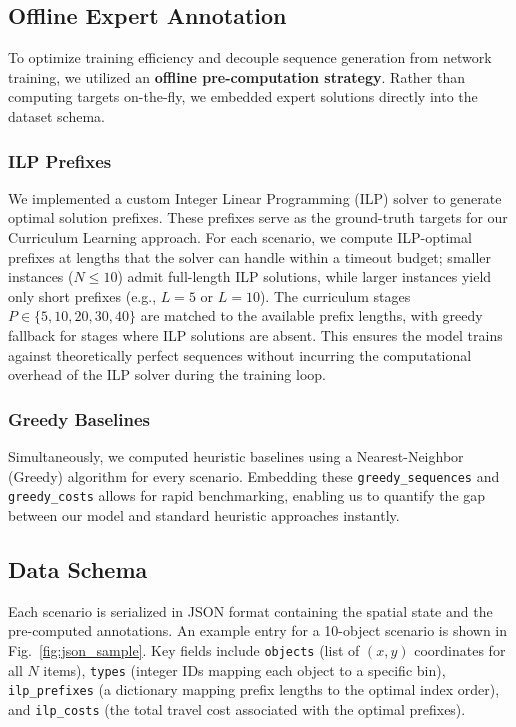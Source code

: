 \documentclass[conference]{IEEEtran}
\begin{document}
\subsection{Offline Expert Annotation}
To optimize training efficiency and decouple sequence generation from network training, we utilized an \textbf{offline pre-computation strategy}. Rather than computing targets on-the-fly, we embedded expert solutions directly into the dataset schema.

\subsubsection{ILP Prefixes}
We implemented a custom Integer Linear Programming (ILP) solver to generate optimal solution prefixes. These prefixes serve as the ground-truth targets for our Curriculum Learning approach. For each scenario, we compute ILP-optimal prefixes at lengths that the solver can handle within a timeout budget; smaller instances ($N{\le}10$) admit full-length ILP solutions, while larger instances yield only short prefixes (e.g., $L{=}5$ or $L{=}10$). The curriculum stages $P \in \{5,10,20,30,40\}$ are matched to the available prefix lengths, with greedy fallback for stages where ILP solutions are absent. This ensures the model trains against theoretically perfect sequences without incurring the computational overhead of the ILP solver during the training loop.

\subsubsection{Greedy Baselines}
Simultaneously, we computed heuristic baselines using a Nearest-Neighbor (Greedy) algorithm for every scenario. Embedding these \texttt{greedy\_sequences} and \texttt{greedy\_costs} allows for rapid benchmarking, enabling us to quantify the gap between our model and standard heuristic approaches instantly.

\subsection{Data Schema}
Each scenario is serialized in JSON format containing the spatial state and the pre-computed annotations. An example entry for a 10-object scenario is shown in Fig.~\ref{fig:json_sample}. Key fields include \texttt{objects} (list of $(x, y)$ coordinates for all $N$ items), \texttt{types} (integer IDs mapping each object to a specific bin), \texttt{ilp\_prefixes} (a dictionary mapping prefix lengths to the optimal index order), and \texttt{ilp\_costs} (the total travel cost associated with the optimal prefixes).
\end{document}
